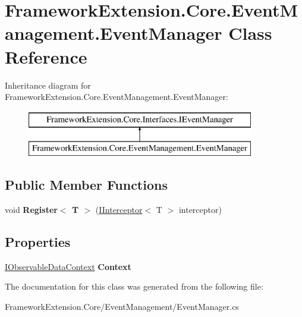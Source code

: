 \hypertarget{class_framework_extension_1_1_core_1_1_event_management_1_1_event_manager}{\section{Framework\-Extension.\-Core.\-Event\-Management.\-Event\-Manager Class Reference}
\label{class_framework_extension_1_1_core_1_1_event_management_1_1_event_manager}
}
Inheritance diagram for Framework\-Extension.\-Core.\-Event\-Management.\-Event\-Manager\-:\begin{figure}[H]
\begin{center}
\leavevmode
\includegraphics[height=2.000000cm]{class_framework_extension_1_1_core_1_1_event_management_1_1_event_manager}
\end{center}
\end{figure}
\subsection*{Public Member Functions}
\begin{DoxyCompactItemize}
\item 
\hypertarget{class_framework_extension_1_1_core_1_1_event_management_1_1_event_manager_a0180980ef769616dc7506c90c14fa84f}{void {\bfseries Register$<$ T $>$} (\hyperlink{interface_framework_extension_1_1_core_1_1_interfaces_1_1_i_interceptor-g}{I\-Interceptor}$<$ T $>$ interceptor)}\label{class_framework_extension_1_1_core_1_1_event_management_1_1_event_manager_a0180980ef769616dc7506c90c14fa84f}

\end{DoxyCompactItemize}
\subsection*{Properties}
\begin{DoxyCompactItemize}
\item 
\hypertarget{class_framework_extension_1_1_core_1_1_event_management_1_1_event_manager_aeb68a53416ac81a44de02512adeaec4a}{\hyperlink{interface_framework_extension_1_1_core_1_1_interfaces_1_1_i_observable_data_context}{I\-Observable\-Data\-Context} {\bfseries Context}}\label{class_framework_extension_1_1_core_1_1_event_management_1_1_event_manager_aeb68a53416ac81a44de02512adeaec4a}

\end{DoxyCompactItemize}


The documentation for this class was generated from the following file\-:\begin{DoxyCompactItemize}
\item 
Framework\-Extension.\-Core/\-Event\-Management/Event\-Manager.\-cs\end{DoxyCompactItemize}
